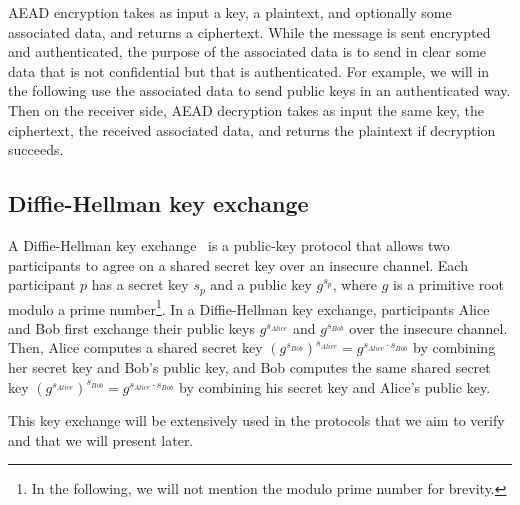 AEAD encryption takes as input a key, a plaintext, and optionally some associated data, and returns a ciphertext.
While the message is sent encrypted and authenticated, the purpose of the associated data is to send in clear some data that is not confidential but that is authenticated.
For example, we will in the following use the associated data to send public keys in an authenticated way.
Then on the receiver side, AEAD decryption takes as input the same key, the ciphertext, the received associated data, and returns the plaintext if decryption succeeds.

\subsection{Diffie-Hellman key exchange}

A Diffie-Hellman key exchange~\cite{diffie2022new} is a public-key protocol that allows two participants to agree on a shared secret key over an insecure channel.
Each participant $p$ has a secret key $s_p$ and a public key $g^{s_p}$, where $g$ is a primitive root modulo a prime number\footnote{
    In the following, we will not mention the modulo prime number for brevity.
}.
In a Diffie-Hellman key exchange, participants Alice and Bob first exchange their public keys $g^{s_{Alice}}$ and $g^{s_{Bob}}$ over the insecure channel.
Then, Alice computes a shared secret key $(g^{s_{Bob}})^{s_{Alice}} = g^{s_{Alice} \cdot s_{Bob}}$ by combining her secret key and Bob's public key, and Bob computes the same shared secret key $(g^{s_{Alice}})^{s_{Bob}} = g^{s_{Alice} \cdot s_{Bob}}$ by combining his secret key and Alice's public key.

This key exchange will be extensively used in the protocols that we aim to verify and that we will present later.